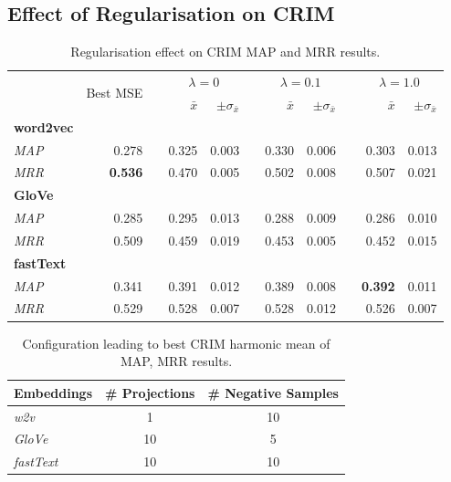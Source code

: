 \subsection{Effect of Regularisation on CRIM}
\begin{table}\centering
\begin{tabular}{@{}lrcrrcrrcrr@{}}\toprule
& \multirow{2}{*}{Best MSE} & \phantom{a} &  \multicolumn{2}{c}{$\lambda=0$} & \phantom{a} & \multicolumn{2}{c}{$\lambda=0.1$} & \phantom{a} & \multicolumn{2}{c}{$\lambda=1.0$}\\
\cmidrule{4-5} \cmidrule{7-8} \cmidrule{10-11}
&  && $\bar{x}$ & $\pm\sigma_{\bar{x}}$ && $\bar{x}$ & $\pm\sigma_{\bar{x}}$ && $\bar{x}$ & $\pm\sigma_{\bar{x}}$ \\ \midrule
\textbf{word2vec} \\
\textit{MAP} & 0.278 && 0.325 & 0.003 && 0.330 & 0.006 && 0.303 & 0.013 \\
\textit{MRR} & \textbf{0.536} && 0.470 & 0.005 && 0.502 & 0.008 && 0.507 & 0.021 \\
\cmidrule{2-11}
\textbf{GloVe} \\
\textit{MAP} & 0.285 && 0.295 & 0.013 && 0.288 & 0.009 && 0.286 & 0.010 \\
\textit{MRR} & 0.509 && 0.459 & 0.019 && 0.453 & 0.005 && 0.452 & 0.015 \\
\cmidrule(lr){2-11}
\textbf{fastText} \\
\textit{MAP} & 0.341 && 0.391 & 0.012 && 0.389 & 0.008 && \textbf{0.392} & 0.011 \\
\textit{MRR} & 0.529 && 0.528 & 0.007 && 0.528 & 0.012 && 0.526 & 0.007 \\
\bottomrule
\end{tabular}
\caption{Regularisation effect on CRIM \ac{MAP} and \ac{MRR} results.}\label{tab:crim_regularised}
\end{table}

\begin{table}\centering
\begin{tabular}{@{}lcc@{}}\toprule
\textbf{Embeddings} & \textbf{\# Projections} & \textbf{\# Negative Samples}\\
\midrule
\textit{w2v} & 1 & 10\\
\textit{GloVe} & 10 & 5\\
\textit{fastText} & 10 & 10\\
\bottomrule
\end{tabular}
\caption{Configuration leading to best CRIM harmonic mean of \ac{MAP}, \ac{MRR} results.}\label{tab:crim_best_parameter_combination}
\end{table}

